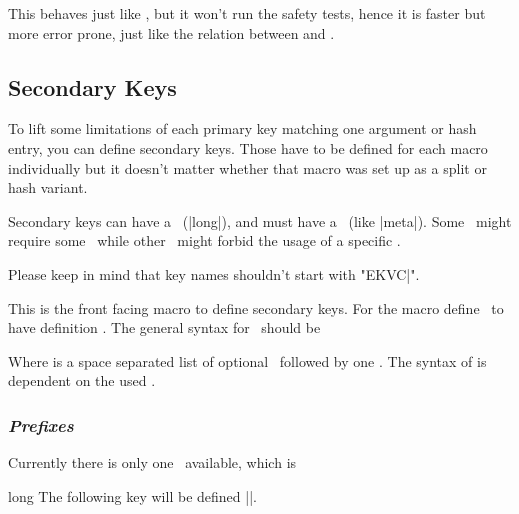 \begin{function}{\ekvcValueSplitFast}
  \begin{syntax}
  \end{syntax}
  This behaves just like , but it won't run the safety tests,
  hence it is faster but more error prone, just like the relation between
   and .
\end{function}


\subsection{Secondary Keys\label{sec:c:secondary}}

To lift some limitations of each primary key matching one argument or hash
entry, you can define secondary keys. Those have to be defined for each macro
individually but it doesn't matter whether that macro was set up as a split or
hash variant.

Secondary keys can have a \prefix\ (|long|), and must have a \type\
(like |meta|). Some \types\ might require some \prefix\ while other
\types\ might forbid the usage of a specific \prefix.

Please keep in mind that key names shouldn't start with "EKVC|".

\begin{function}{\ekvcSecondaryKeys}
  \begin{syntax}
    \kvarg
  \end{syntax}
  This is the front facing macro to define secondary keys. For the macro
  \meta{cs} define \key\ to have definition \val. The general syntax for \key\
  should be
  \begin{quote}\ttfamily
     
  \end{quote}
  Where \meta{prefix} is a space separated list of optional \prefixes\
  followed by one \type. The syntax of  is dependent on the
  used \type.
\end{function}


\subsubsection{\textit{Prefixes}}

Currently there is only one \prefix\ available, which is
\begin{function}[module=expkv-cs prefix]{long}
  The following key will be defined |\long|.
\end{function}


